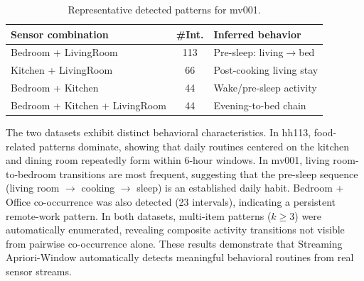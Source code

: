 \begin{table}[t]
\caption{Representative detected patterns for mv001.}
\label{tab:casas_mv001}
\begin{center}
\footnotesize
\begin{tabular}{p{3.5cm}cp{2.0cm}}
\hline
Sensor combination & \#Int. & Inferred behavior \\\hline
Bedroom + LivingRoom               & 113 & Pre-sleep: living$\to$bed \\
Kitchen + LivingRoom               &  66 & Post-cooking living stay \\
Bedroom + Kitchen                  &  44 & Wake/pre-sleep activity \\
Bedroom + Kitchen + LivingRoom     &  44 & Evening-to-bed chain \\\hline
\end{tabular}
\end{center}
\end{table}

The two datasets exhibit distinct behavioral characteristics.
In hh113, food-related patterns dominate, showing that daily routines
centered on the kitchen and dining room repeatedly form within 6-hour
windows.
In mv001, living room-to-bedroom transitions are most frequent,
suggesting that the pre-sleep sequence
(living room $\to$ cooking $\to$ sleep) is an established daily habit.
Bedroom + Office co-occurrence was also detected (23 intervals),
indicating a persistent remote-work pattern.
In both datasets, multi-item patterns ($k \geq 3$) were automatically
enumerated, revealing composite activity transitions not visible
from pairwise co-occurrence alone.
These results demonstrate that Streaming Apriori-Window automatically
detects meaningful behavioral routines from real sensor streams.
